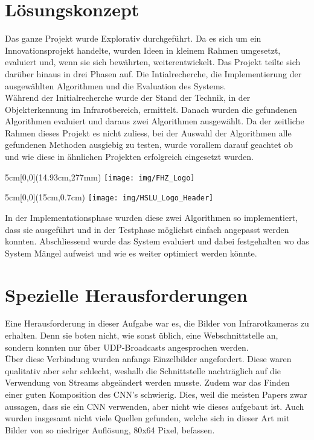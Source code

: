 \documentclass[
	a4paper
]{scrartcl}
\begin{document}
\section{Lösungskonzept}
Das ganze Projekt wurde Explorativ durchgeführt. Da es sich um ein Innovationsprojekt handelte, wurden Ideen in kleinem Rahmen umgesetzt, evaluiert und, wenn sie sich bewährten, weiterentwickelt. Das Projekt teilte sich darüber hinaus in drei Phasen auf. Die Intialrecherche, die Implementierung der ausgewählten Algorithmen und die Evaluation des Systems.\\
Während der Initialrecherche wurde der Stand der Technik, in der Objekterkennung im Infrarotbereich, ermittelt. Danach wurden die gefundenen Algorithmen evaluiert und daraus zwei Algorithmen ausgewählt. Da der zeitliche Rahmen dieses Projekt es nicht zuliess, bei der Auswahl der Algorithmen alle gefundenen Methoden ausgiebig zu testen, wurde vorallem darauf geachtet ob und wie diese in ähnlichen Projekten erfolgreich eingesetzt wurden.

\begin{textblock*}{5cm}[0,0](14.93cm,277mm)
	\texttt{[image: img/FHZ\_Logo]}
\end{textblock*}

\newpage

\begin{textblock*}{5cm}[0,0](15cm,0.7cm)
	\texttt{[image: img/HSLU\_Logo\_Header]}
\end{textblock*}

In der Implementationsphase wurden diese zwei Algorithmen so implementiert, dass sie ausgeführt und in der Testphase möglichst einfach angepasst werden konnten. 
Abschliessend wurde das System evaluiert und dabei festgehalten wo das System Mängel aufweist und wie es weiter optimiert werden könnte.


\section{Spezielle Herausforderungen}
Eine Herausforderung in dieser Aufgabe war es, die Bilder von Infrarotkameras zu erhalten. Denn sie boten nicht, wie sonst üblich, eine Webschnittstelle an, sondern konnten nur über UDP-Broadcasts angesprochen werden.\\
Über diese Verbindung wurden anfangs Einzelbilder angefordert. Diese waren qualitativ aber sehr schlecht, weshalb die Schnittstelle nachträglich auf die Verwendung von Streams abgeändert werden musste.
Zudem war das Finden einer guten Komposition des CNN's schwierig. Dies, weil die meisten Papers zwar aussagen, dass sie ein CNN verwenden, aber nicht wie dieses aufgebaut ist. Auch wurden insgesamt nicht viele Quellen gefunden, welche sich in dieser Art mit Bilder von so niedriger Auflösung, 80x64 Pixel, befassen.
\end{document}
